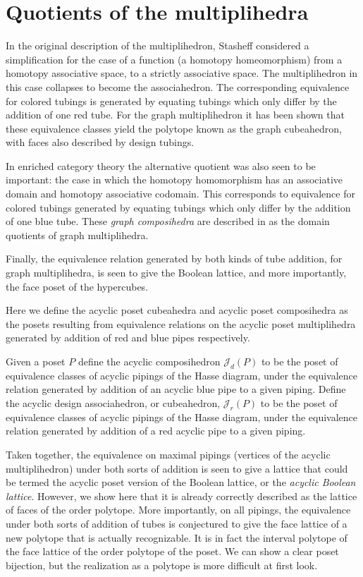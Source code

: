 \documentclass{article}
\begin{document}
\section{Quotients of the multiplihedra}\label{conjy}

In the original description of the multiplihedron, Stasheff  considered a simplification for the case of a function (a homotopy homeomorphism) from a homotopy associative space, to a strictly associative space. The multiplihedron in this case collapses to become the associahedron. The corresponding equivalence for colored tubings is generated by equating tubings which only differ by the addition of one red tube. For the graph multiplihedron it has been shown that these equivalence classes yield the polytope known as the graph cubeahedron, with faces also described by design tubings. 

In enriched category theory the alternative quotient was also seen to be important: the case in which the homotopy homomorphism has an associative domain and homotopy associative codomain. This corresponds to equivalence for colored tubings generated by equating tubings which only differ by the addition of one blue tube. These \textit{graph composihedra} are described in \cite{dev-forc} as the domain quotients of graph multiplihedra.

Finally, the equivalence relation generated by both kinds of tube addition, for graph multiplihedra, is seen to give the Boolean lattice, and more importantly, the face poset of the hypercubes.  

Here we define the acyclic poset cubeahedra and acyclic poset composihedra as the posets resulting from equivalence relations on the acyclic poset multiplihedra generated by addition  of red and blue pipes respectively.
\begin{defn}
    Given a poset $P$ define the acyclic composihedron   $\mathcal{J}_d(P)$ to be the poset of equivalence classes of acyclic pipings of the Hasse diagram, under the equivalence relation generated by addition of an acyclic blue pipe to a given piping. Define the acyclic design associahedron, or cubeahedron, $\mathcal{J}_r(P)$ to be the poset of equivalence classes of acyclic pipings of the Hasse diagram, under the equivalence relation generated by addition of a red acyclic pipe to a given piping.
\end{defn}

Taken together, the equivalence on maximal pipings (vertices of the acyclic multiplihedron) under both sorts of addition is seen to give a lattice that could be termed the acyclic poset version of the Boolean lattice, or the \textit{acyclic Boolean lattice}. However, we show here that it is already correctly described as the lattice of faces of the order polytope. More importantly, on all pipings, the equivalence under both sorts of addition of tubes is conjectured to give the face lattice of a new polytope that is actually recognizable. It is in fact the interval polytope of the face lattice of the order polytope of the poset. We can show a clear poset bijection, but the realization as a polytope is more difficult at first look.
\end{document}
